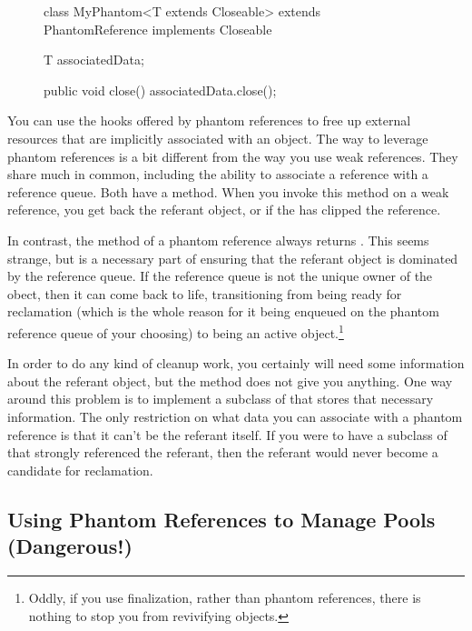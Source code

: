 \begin{figure}
\centering
\begin{framedlisting}
class MyPhantom<T extends Closeable> extends PhantomReference implements Closeable {
  T associatedData;
  
  public void close() {
     associatedData.close();
  }
}
\end{framedlisting}
\end{figure}
You can use the hooks offered by phantom references to free up external
resources that are implicitly associated with an object. The way to
leverage phantom references is a bit different from the way  you use weak
references. They share much in common, including  the ability to associate a
reference with a reference queue. Both have a  method. When you 
invoke this method on a weak reference, you get back the referant object, or
 if the \jre has clipped the reference. 

In contrast, the  method of a phantom reference always returns
. This seems strange, but is a necessary part of ensuring that the
referant object is dominated by the reference queue. If the reference queue is
not the unique owner of the obect, then it can come back to life, transitioning
from being ready for reclamation (which is the whole reason for it being
enqueued on the phantom reference queue of your choosing) to being an active
object.\footnote{Oddly, if you use finalization, rather than phantom references,
there is nothing to stop you from revivifying objects.}

In order to do any kind of cleanup work, you certainly will need some
information about the referant object, but the  method does not give
you anything. One way around this problem is to implement a subclass of
  that stores that necessary information. The only
restriction on what data you can associate with a phantom reference is that it
can't be the referant itself. If you were to have a subclass of
 that strongly referenced the referant, then the
referant would never become a candidate for reclamation.




\subsection{Using Phantom References to Manage Pools (Dangerous!)}

